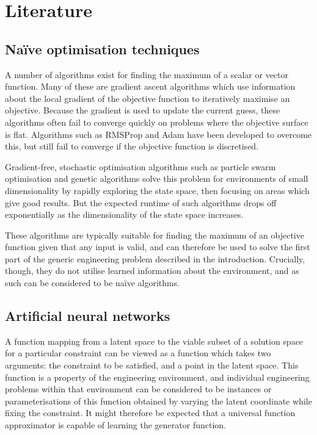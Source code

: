 \documentclass[../../main.tex]{subfiles}
\begin{document}
\chapter{Literature}

\section{Na\"{i}ve optimisation techniques}

A number of algorithms exist for finding the maximum of a scalar or vector function.
Many of these are gradient ascent algorithms \cite{ruder17} which use information about the local gradient of the objective function
to iteratively maximise an objective.
Because the gradient is used to update the current guess, these algorithms often fail to converge quickly on problems where the objective surface is flat.
Algorithms such as RMSProp \cite{hinton17} and Adam \cite{kingma17} have been developed to overcome this, but still fail to converge if the objective function is discretised.

Gradient-free, stochastic optimisation algorithms such as particle swarm optimisation \cite{kennedy12} and genetic algorithms \cite{carr14} solve this problem for environments of small dimensionality by rapidly exploring the state space, then focusing on areas which give good results.
But the expected runtime of such algorithms drops off exponentially as the dimensionality of the state space increases.

These algorithms are typically suitable for finding the maximum of an objective function given that any input is valid, and can therefore be used to solve the first part of the generic engineering problem described in the introduction.
Crucially, though, they do not utilise learned information about the environment, and as such can be considered to be na\"{i}ve algorithms.

\section{Artificial neural networks}

A function mapping from a latent space to the viable subset of a solution space for a particular constraint can be viewed as a function which takes two arguments: the constraint to be satisfied, and a point in the latent space.
This function is a property of the engineering environment, and individual engineering problems within that environment can be considered to be instances or parameterisations of this function obtained by varying the latent coordinate while fixing the constraint.
It might therefore be expected that a universal function approximator is capable of learning the generator function.
\end{document}
